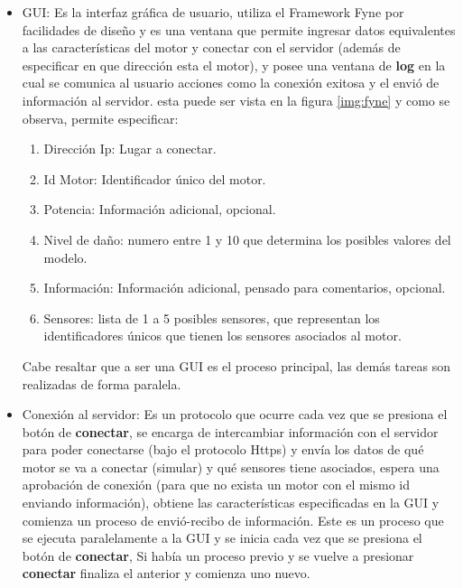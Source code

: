 \begin{itemize}
    \item GUI: Es la interfaz gráfica de usuario, utiliza el Framework Fyne por
        facilidades
        de diseño y es una ventana que permite ingresar datos equivalentes
        a las características del motor y conectar con el servidor (además de
        especificar en que dirección esta el motor), y posee una ventana de
        \textbf{log}  en la cual se comunica al usuario acciones como la conexión exitosa y
        el envió de información al servidor. esta puede ser vista
        en la figura \ref{img:fyne} y como se observa, permite especificar:
        \begin{enumerate}
            \item Dirección Ip: Lugar a conectar.
            \item Id Motor: Identificador único del motor.
            \item Potencia: Información adicional, opcional.
            \item Nivel de daño: numero entre 1 y 10 que determina los posibles
                valores del modelo.
            \item Información: Información adicional, pensado para comentarios,
                opcional.
            \item Sensores: lista de 1 a 5 posibles sensores, que representan
                los identificadores únicos que tienen los sensores asociados
                al motor.
        \end{enumerate}

        Cabe resaltar que a ser una GUI es el proceso principal, las demás
        tareas son realizadas de forma paralela.

    \item Conexión al servidor: Es un protocolo que ocurre cada vez que se presiona
        el botón de \textbf{conectar}, se encarga de intercambiar información con el servidor
        para poder conectarse (bajo el protocolo Https) y envía los datos de
        qué motor se va a conectar (simular) y qué sensores tiene asociados, espera
        una aprobación de conexión (para que no exista un motor con el mismo id enviando
        información), obtiene las características especificadas en la GUI y
        comienza un proceso de envió-recibo de información.
        Este es un proceso
        que se ejecuta paralelamente a la GUI y se inicia cada vez que se
        presiona el botón de \textbf{conectar}, Si había un proceso previo y se vuelve a
        presionar \textbf{conectar} finaliza el anterior y comienza uno nuevo.


\end{itemize}
